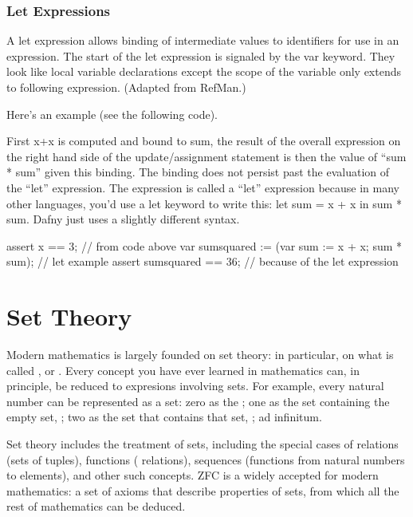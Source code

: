 \documentclass[letterpaper,10pt,english]{sphinxmanual}
\begin{document}
\subsection{Let Expressions}
\label{\detokenize{06-dafny-language:let-expressions}}
A let expression allows binding of intermediate values to identifiers
for use in an expression. The start of the let expression is signaled
by the var keyword. They look like local variable declarations except
the scope of the variable only extends to following
expression. (Adapted from RefMan.)

Here’s an example (see the following code).

First x+x is computed and bound to sum, the result of the overall
expression on the right hand side of the update/assignment statement
is then the value of “sum * sum” given this binding. The binding does
not persist past the evaluation of the “let” expression.  The
expression is called a “let” expression because in many other
languages, you’d use a let keyword to write this: let sum = x + x in
sum * sum. Dafny just uses a slightly different syntax.

\begin{sphinxVerbatim}[commandchars=\\\{\}]
assert x == 3;               // from code above
var sumsquared := (var sum := x + x; sum * sum);  // let example
assert sumsquared == 36;     // because of the let expression
\end{sphinxVerbatim}


\chapter{Set Theory}
\label{\detokenize{07-set-theory::doc}}\label{\detokenize{07-set-theory:set-theory}}
Modern mathematics is largely founded on set theory: in particular, on
what is called ,
or . Every concept you have ever learned in mathematics can, in
principle, be reduced to expresions involving sets.  For example,
every natural number can be represented as a set: zero as the ; one as the set containing the empty set, \sphinxstyleemphasis{\{\{\}\}}; two as the
set that contains that set, \sphinxstyleemphasis{\{\{\{\}\}\}}; ad infinitum.

Set theory includes the treatment of sets, including the special cases
of relations (sets of tuples), functions ( relations),
sequences (functions from natural numbers to elements), and other such
concepts.  ZFC is a widely accepted  for modern
mathematics: a set of axioms that describe properties of sets, from
which all the rest of mathematics can be deduced.
\end{document}
